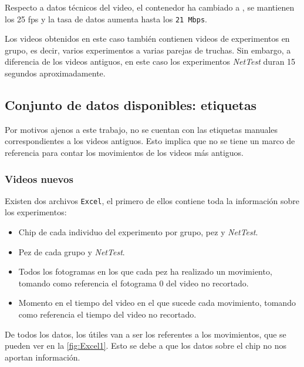 Respecto a datos técnicos del video, el contenedor ha cambiado a \texttt{}, se mantienen los 25 \acrshort{fps} y la tasa de datos aumenta hasta los \texttt{21 Mbps}.

Los videos obtenidos en este caso también contienen videos de experimentos en grupo, es decir, varios experimentos a varias parejas de truchas. Sin embargo, a diferencia de los videos antiguos, 
en este caso los experimentos \textit{NetTest} duran 15 segundos aproximadamente.

\subsection{Conjunto de datos disponibles: etiquetas}

Por motivos ajenos a este trabajo, no se cuentan con las etiquetas manuales correspondientes a los videos antiguos. Esto implica que no se tiene un marco de referencia para 
contar los movimientos de los videos más antiguos.

\subsubsection{Videos nuevos}

Existen dos archivos \texttt{Excel}, el primero de ellos contiene toda la información sobre los experimentos:
\begin{itemize}
    \item Chip de cada individuo del experimento por grupo, pez y \textit{NetTest}.
    \item Pez de cada grupo y \textit{NetTest}.
    \item Todos los fotogramas en los que cada pez ha realizado un movimiento, tomando como referencia el fotograma 0 del video no recortado.
    \item Momento en el tiempo del video en el que sucede cada movimiento, tomando como referencia el tiempo del video no recortado.
\end{itemize}

De todos los datos, los útiles van a ser los referentes a los movimientos, que se pueden ver en la \autoref{fig:Excel1}. Esto se debe a que los datos sobre el chip no nos aportan información.

